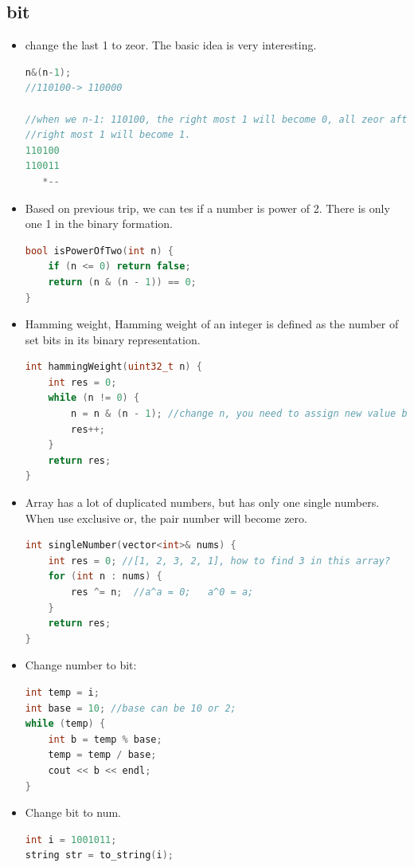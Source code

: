 \documentclass[a4paper,11pt,twoside]{book}
\begin{document}
\subsection{bit}
\begin{itemize}
	\item change the last 1 to zeor. The basic idea is very interesting. 
\begin{lstlisting}[frame=single, language=c++]	
n&(n-1);
//110100-> 110000

//when we n-1: 110100, the right most 1 will become 0, all zeor after 
//right most 1 will become 1. 
110100
110011
   *--
\end{lstlisting}

	\item Based on previous trip, we can tes if a number is power of 2. There is only one 1 in the binary formation.
\begin{lstlisting}[frame=single, language=c++]	
bool isPowerOfTwo(int n) {
	if (n <= 0) return false;
	return (n & (n - 1)) == 0;
}	
\end{lstlisting}

	\item Hamming weight,  Hamming weight of an integer is defined as the number of set bits in its binary representation. 
\begin{lstlisting}[frame=single, language=c++]	
int hammingWeight(uint32_t n) {
	int res = 0;
	while (n != 0) {
		n = n & (n - 1); //change n, you need to assign new value back to n. 
		res++;
	}
	return res;
}
\end{lstlisting}
	
	\item Array has a lot of duplicated numbers, but has only one single numbers.  When use exclusive or, the pair number will become zero.
\begin{lstlisting}[frame=single, language=c++]	
int singleNumber(vector<int>& nums) {
	int res = 0; //[1, 2, 3, 2, 1], how to find 3 in this array? 
	for (int n : nums) {
		res ^= n;  //a^a = 0;   a^0 = a;
	}
	return res;
}
\end{lstlisting}

	\item Change number to bit: 
\begin{lstlisting}[frame=single, language=c++]	
int temp = i;
int base = 10; //base can be 10 or 2;
while (temp) {
	int b = temp % base;
	temp = temp / base;
	cout << b << endl;
}	
\end{lstlisting}	
	
	\item Change bit to num.
\begin{lstlisting}[frame=single, language=c++]	
int i = 1001011;
string str = to_string(i);


\end{lstlisting}
\end{itemize}
\end{document}
